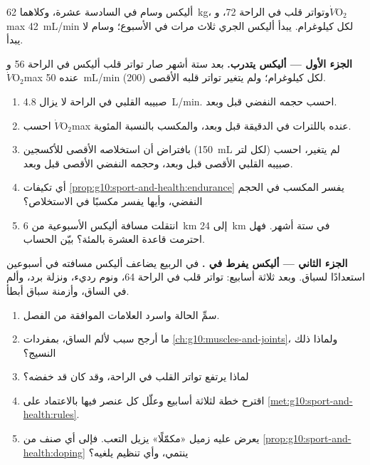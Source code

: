\begin{problem}
\label{pb:g10:sport-and-health:1}
أليكس وسام في السادسة عشرة، وكلاهما \qty{62}{kg}، وتواتر قلب في الراحة
72، و$\dot V\!\mathrm{O_2}$max \qty{42}{mL/min} لكل كيلوغرام. يبدأ
أليكس الجري ثلاث مرات في الأسبوع؛ وسام لا يبدأ.

\medskip
\noindent\textbf{الجزء الأول --- أليكس يتدرب.}
بعد ستة أشهر صار تواتر قلب أليكس في الراحة 56 و$\dot V\!\mathrm{O_2}$max
عنده \qty{50}{mL/min} لكل كيلوغرام؛ ولم يتغير تواتر قلبه الأقصى (200).
\begin{enumerate}
  \item صبيبه القلبي في الراحة لا يزال \qty{4.8}{L/min}. احسب حجمه
        النفضي قبل وبعد.
  \item احسب $\dot V\!\mathrm{O_2}$max عنده باللترات في الدقيقة قبل
        وبعد، والمكسب بالنسبة المئوية.
  \item بافتراض أن استخلاصه الأقصى للأكسجين (\qty{150}{mL} لكل لتر) لم
        يتغير، احسب صبيبه القلبي الأقصى قبل وبعد، وحجمه النفضي الأقصى
        قبل وبعد.
  \item أي تكيفات \cref{prop:g10:sport-and-health:endurance} يفسر
        المكسب في الحجم النفضي، وأيها يفسر مكسبًا في الاستخلاص؟
  \item انتقلت مسافة أليكس الأسبوعية من \qty{6}{km} إلى \qty{24}{km}
        في ستة أشهر. فهل احترمت قاعدة العشرة بالمئة؟ بيّن الحساب.
\end{enumerate}

\medskip
\noindent\textbf{الجزء الثاني --- أليكس يفرط في .}
في الربيع يضاعف أليكس مسافته في أسبوعين استعدادًا لسباق. وبعد ثلاثة
أسابيع: تواتر قلب في الراحة 64، ونوم رديء، ونزلة برد، وألم في الساق،
وأزمنة سباق أبطأ.
\begin{enumerate}[resume]
  \item سمِّ الحالة واسرد العلامات الموافقة من الفصل.
  \item ما أرجح سبب لألم الساق، بمفردات
        \cref{ch:g10:muscles-and-joints}، ولماذا ذلك النسيج؟
  \item لماذا يرتفع تواتر القلب في الراحة، وقد كان  قد خفضه؟
  \item اقترح خطة لثلاثة أسابيع وعلّل كل عنصر فيها
        بالاعتماد على \cref{met:g10:sport-and-health:rules}.
  \item يعرض عليه زميل «مكمّلًا» يزيل التعب. فإلى أي صنف من
        \cref{prop:g10:sport-and-health:doping} ينتمي، وأي تنظيم
        يلغيه؟
\end{enumerate}


\end{problem}

